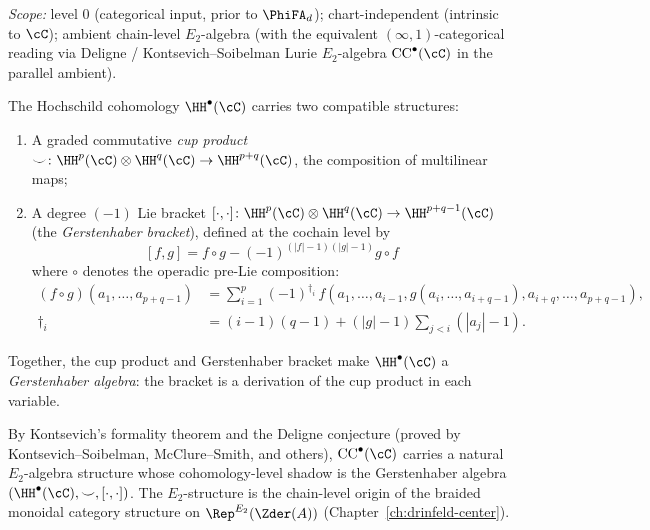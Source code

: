 \begin{theorem}
\label{thm:gerstenhaber}
\textsl{Scope:} level $0$ (categorical input, prior to $\PhiFA_d$);
chart-independent (intrinsic to $\cC$); ambient chain-level
$E_2$-algebra (with the equivalent $(\infty, 1)$-categorical reading
via Deligne / Kontsevich--Soibelman Lurie $E_2$-algebra
$\mathrm{CC}^\bullet(\cC)$ in the parallel ambient).

The Hochschild cohomology $\HH^\bullet(\cC)$ carries two compatible
structures:
\begin{enumerate}[label=(\roman*)]
 \item A graded commutative \emph{cup product}
 $\smile \colon \HH^p(\cC) \otimes \HH^q(\cC) \to \HH^{p+q}(\cC)$,
 the composition of multilinear maps;
 \item A degree $(-1)$ Lie bracket
 $[\cdot, \cdot] \colon
 \HH^p(\cC) \otimes \HH^q(\cC) \to \HH^{p+q-1}(\cC)$
 (the \emph{Gerstenhaber bracket}), defined at the cochain level by
 \[
 [f, g] = f \circ g - (-1)^{(|f|-1)(|g|-1)} g \circ f
 \]
 where $\circ$ denotes the operadic pre-Lie composition:
 \begin{align*}
 (f \circ g)(a_1, \ldots, a_{p+q-1})
 &= \sum_{i=1}^{p} (-1)^{\dagger_i}\,
 f(a_1, \ldots, a_{i-1}, g(a_i, \ldots, a_{i+q-1}), a_{i+q}, \ldots, a_{p+q-1}), \\
 \dagger_i &= (i-1)(q-1) + (|g|-1)\sum_{j<i}(|a_j|-1).
 \end{align*}
\end{enumerate}
Together, the cup product and Gerstenhaber bracket make
$\HH^\bullet(\cC)$ a \emph{Gerstenhaber algebra}: the bracket is a
derivation of the cup product in each variable.
\end{theorem}

\begin{remark}[Gerstenhaber = \texorpdfstring{$E_2$}{E-2} cohomology]
\label{rem:gerstenhaber-e2}
By Kontsevich's formality theorem and the Deligne conjecture
(proved by Kontsevich--Soibelman, McClure--Smith, and others),
$\mathrm{CC}^\bullet(\cC)$ carries a natural $E_2$-algebra structure
whose cohomology-level shadow is the Gerstenhaber algebra
$(\HH^\bullet(\cC), \smile, [\cdot, \cdot])$. The $E_2$-structure
is the chain-level origin of the braided monoidal category
structure on $\Rep^{E_2}(\Zder(A))$ (Chapter~\ref{ch:drinfeld-center}).
\end{remark}

